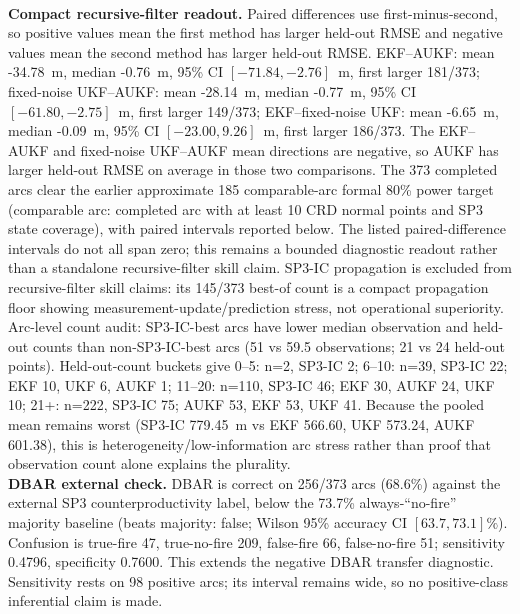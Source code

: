 \begin{table}[t]
  \\[2pt] {\footnotesize \textbf{Compact recursive-filter readout.} Paired differences use first-minus-second, so positive values mean the first method has larger held-out RMSE and negative values mean the second method has larger held-out RMSE. EKF--AUKF: mean -34.78~m, median -0.76~m, 95\% CI $[-71.84,-2.76]$~m, first larger 181/373; fixed-noise UKF--AUKF: mean -28.14~m, median -0.77~m, 95\% CI $[-61.80,-2.75]$~m, first larger 149/373; EKF--fixed-noise UKF: mean -6.65~m, median -0.09~m, 95\% CI $[-23.00,9.26]$~m, first larger 186/373. The EKF--AUKF and fixed-noise UKF--AUKF mean directions are negative, so AUKF has larger held-out RMSE on average in those two comparisons. The 373 completed arcs clear the earlier approximate 185 comparable-arc formal 80\% power target (comparable arc: completed arc with at least 10 CRD normal points and SP3 state coverage), with paired intervals reported below. The listed paired-difference intervals do not all span zero; this remains a bounded diagnostic readout rather than a standalone recursive-filter skill claim. SP3-IC propagation is excluded from recursive-filter skill claims: its 145/373 best-of count is a compact propagation floor showing measurement-update/prediction stress, not operational superiority. Arc-level count audit: SP3-IC-best arcs have lower median observation and held-out counts than non-SP3-IC-best arcs (51 vs 59.5 observations; 21 vs 24 held-out points). Held-out-count buckets give 0--5: n=2, SP3-IC 2; 6--10: n=39, SP3-IC 22; EKF 10, UKF 6, AUKF 1; 11--20: n=110, SP3-IC 46; EKF 30, AUKF 24, UKF 10; 21+: n=222, SP3-IC 75; AUKF 53, EKF 53, UKF 41. Because the pooled mean remains worst (SP3-IC 779.45~m vs EKF 566.60, UKF 573.24, AUKF 601.38), this is heterogeneity/low-information arc stress rather than proof that observation count alone explains the plurality.}
  \\[2pt] {\footnotesize \textbf{DBAR external check.} DBAR is correct on 256/373 arcs (68.6\%) against the external SP3 counterproductivity label, below the 73.7\% always-``no-fire'' majority baseline (beats majority: false; Wilson 95\% accuracy CI $[63.7,73.1]\%$). Confusion is true-fire 47, true-no-fire 209, false-fire 66, false-no-fire 51; sensitivity 0.4796, specificity 0.7600. This extends the negative DBAR transfer diagnostic. Sensitivity rests on 98 positive arcs; its interval remains wide, so no positive-class inferential claim is made.}
\end{table}